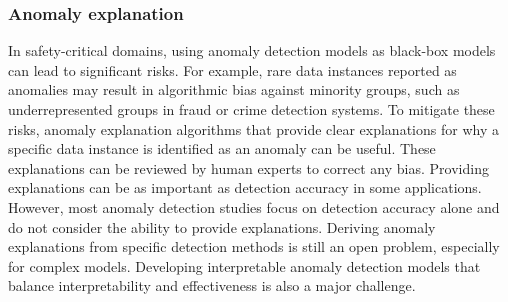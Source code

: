 \subsubsection{Anomaly explanation}
In safety-critical domains, using anomaly detection models as black-box models can lead to significant risks. For example, rare data instances reported as anomalies may result in algorithmic bias against minority groups, such as underrepresented groups in fraud or crime detection systems. To mitigate these risks, anomaly explanation algorithms that provide clear explanations for why a specific data instance is identified as an anomaly can be useful. These explanations can be reviewed by human experts to correct any bias. Providing explanations can be as important as detection accuracy in some applications. However, most anomaly detection studies focus on detection accuracy alone and do not consider the ability to provide explanations. Deriving anomaly explanations from specific detection methods is still an open problem, especially for complex models. Developing interpretable anomaly detection models that balance interpretability and effectiveness is also a major challenge.